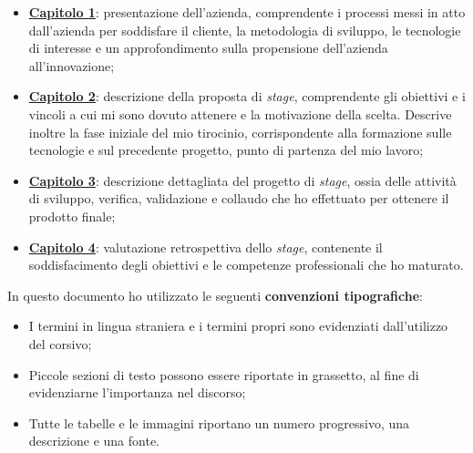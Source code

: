 \begin{itemize}
  \item \hyperref[cap:contesto-aziendale]{\textbf{Capitolo 1}}: presentazione dell'azienda, comprendente i processi messi in atto dall'azienda per soddisfare il cliente, la metodologia di sviluppo, le tecnologie di interesse e un approfondimento sulla propensione dell'azienda all'innovazione;
  \item \hyperref[cap:progetto-contesto-aziendale]{\textbf{Capitolo 2}}: descrizione della proposta di \textit{stage}, comprendente gli obiettivi e i vincoli a cui mi sono dovuto attenere e la motivazione della scelta. Descrive inoltre la fase iniziale del mio tirocinio, corrispondente alla formazione sulle tecnologie e sul precedente progetto, punto di partenza del mio lavoro;
  \item \hyperref[cap:progetto-stage]{\textbf{Capitolo 3}}: descrizione dettagliata del progetto di \textit{stage}, ossia delle attività di sviluppo, verifica, validazione e collaudo che ho effettuato per ottenere il prodotto finale;
  \item \hyperref[cap:valutazioni-retrospettive]{\textbf{Capitolo 4}}: valutazione retrospettiva dello \textit{stage}, contenente il soddisfacimento degli obiettivi e le competenze professionali che ho maturato.
\end{itemize}

In questo documento ho utilizzato le seguenti \textbf{convenzioni tipografiche}:
\begin{itemize}
  \item I termini in lingua straniera e i termini propri sono evidenziati dall'utilizzo del corsivo;
  \item Piccole sezioni di testo possono essere riportate in grassetto, al fine di evidenziarne l'importanza nel discorso;
  \item Tutte le tabelle e le immagini riportano un numero progressivo, una descrizione e una fonte.
\end{itemize}


%
%

\endgroup

\vfill

